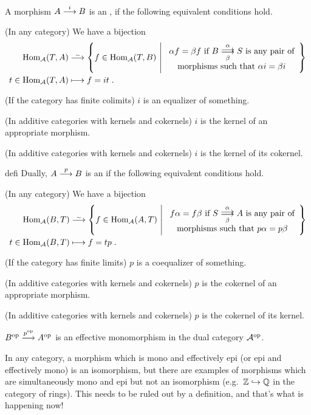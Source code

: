 \documentclass[a4paper,parskip=half,numbers=enddot, DIV=12]{scrreprt}
\begin{document}
\begin{rem}
	\begin{defi}
		A morphism $A\morphism[i]B$ is an , if the following equivalent conditions hold.
		\begin{alphanumerate}
			\item (In any category) We have a bijection
			\begin{align*}
			\Hom_\Aa(T,A)&\isomorphism\left\{f\in\Hom_\Aa(T,B)\st 
			\begin{array}{c}
			\alpha f=\beta f\text{ if }B\doublemorphism[\alpha][\beta]S\text{ is any pair of}\\ 
			\text{morphisms such that }\alpha i=\beta i
			\end{array}
			\right\}\\
			t\in\Hom_\Aa(T,A) &\longmapsto f=it\;.
			\end{align*}
			\item (If the category has finite colimits) $i$ is an equalizer of something.
			\item (In additive categories with kernels and cokernels) $i$ is the kernel of an appropriate morphism.
			\item (In additive categories with kernels and cokernels) $i$ is the kernel of its cokernel.
		\end{alphanumerate}
	\end{defi}
	\begin{varthm}{defi}
		Dually, $A\morphism[p]B$ is an  if the following equivalent conditions hold.
		\begin{alphanumerate}
			\item (In any category) We have a bijection
			\begin{align*}
			\Hom_\Aa(B,T)&\isomorphism\left\{f\in\Hom_\Aa(A,T)\st 
			\begin{array}{c}
			f\alpha =f\beta\text{ if }S\doublemorphism[\alpha][\beta]A\text{ is any pair of}\\
			\text{morphisms such that }p\alpha =p\beta 
			\end{array}
			\right\}\\
			t\in\Hom_\Aa(B,T) &\longmapsto f=tp\;.
			\end{align*}
			\item (If the category has finite limits) $p$ is a coequalizer of something.
			\item (In additive categories with kernels and cokernels) $p$ is the cokernel of an appropriate morphism.
			\item (In additive categories with kernels and cokernels) $p$ is the cokernel of its kernel.
			\item $B^\op\morphism[p^\op]A^\op$ is an effective monomorphism in the dual category $\mathcal{A}^{\mathrm{op}}$.
		\end{alphanumerate}
	\end{varthm}
	In any category, a morphism which is mono and effectively epi (or epi and effectively mono) is an isomorphism, but there are examples of morphisms which are simultaneously mono and epi but not an isomorphism (e.g.\ $\IZ\monomorphism\IQ$ in the category of rings). This needs to be ruled out by a definition, and that's what is happening now! 
\end{rem}
\end{document}

